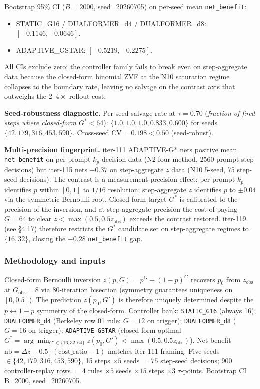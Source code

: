 \documentclass{article}
\begin{document}
Bootstrap 95\% CI ($B=2000$, seed=20260705) on per-seed mean
\texttt{net\_benefit}:
\begin{itemize}
\item STATIC\_G16 / DUALFORMER\_d4 / DUALFORMER\_d8: $[-0.1146,-0.0646]$.
\item ADAPTIVE\_GSTAR: $[-0.5219,-0.2275]$.
\end{itemize}
All CIs exclude zero; the controller family fails to break even on
step-aggregate data because the closed-form binomial ZVF at the N10
saturation regime collapses to the boundary rate, leaving no salvage
on the contrast axis that outweighs the $2$--$4\times$ rollout cost.

\textbf{Seed-robustness diagnostic.} Per-seed salvage rate at
$\tau=0.70$
(\textit{fraction of fired steps where closed-form $G^*<64$}):
$\{1.0, 1.0, 1.0, 0.833, 0.600\}$ for seeds
$\{42, 179, 316, 453, 590\}$. Cross-seed CV$=0.198<0.50$ (seed-robust).

\textbf{Multi-precision fingerprint.} iter-111 ADAPTIVE-G* nets positive
mean \texttt{net\_benefit} on per-prompt $k_p$ decision data (N2
four-method, 2560 prompt-step decisions) but iter-115 nets $-0.37$ on
step-aggregate $z$ data (N10 5-seed, 75 step-seed decisions). The
contrast is a measurement-precision effect: per-prompt $k_p$
identifies $p$ within $[0,1]$ to $1/16$ resolution; step-aggregate $z$
identifies $p$ to $\pm 0.04$ via the symmetric Bernoulli root.
Closed-form target-$G^*$ is calibrated to the precision of the
inversion, and at step-aggregate precision the cost of paying $G=64$
to clear $z<\max(0.5, 0.5z_{\mathrm{obs}})$ exceeds the contrast
restored. iter-119 (see §4.17) therefore restricts the
$G^*$ candidate set on step-aggregate regimes to $\{16, 32\}$,
closing the $-0.28$ \texttt{net\_benefit} gap.

\subsubsection*{Methodology and inputs}
Closed-form Bernoulli inversion $z(p,G)=p^G+(1-p)^G$ recovers
$p_0$ from $z_{\mathrm{obs}}$ at $G_{\mathrm{obs}}=8$ via 80-iteration
bisection (symmetry guarantees uniqueness on $[0,0.5]$). The
prediction $z(p_0, G')$ is therefore uniquely determined despite the
$p \leftrightarrow 1-p$ symmetry of the closed-form. Controller bank:
\texttt{STATIC\_G16} (always 16); \texttt{DUALFORMER\_d4}
(Berkeley row 01 rule: $G=12$ on trigger); \texttt{DUALFORMER\_d8}
($G=16$ on trigger); \texttt{ADAPTIVE\_GSTAR} (closed-form optimal
$G^*=\arg\min_{G'\in\{16,32,64\}}z(p_0,G')<\max(0.5,0.5z_{\mathrm{obs}})$).
Net benefit $\mathrm{nb}=\Delta z - 0.5\cdot(\mathrm{cost\_ratio}-1)$
matches iter-111 framing. Five seeds $\in\{42,179,316,453,590\}$, 15
steps $\times 5$ seeds $=75$ step-seed decisions; 900 controller-replay
rows $=4$ rules $\times 5$ seeds $\times 15$ steps $\times 3$
$\tau$-points. Bootstrap CI B=2000, seed=20260705.
\end{document}
